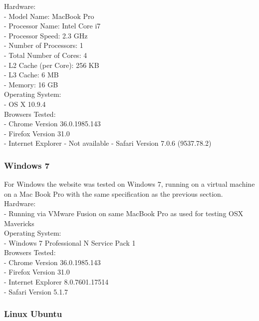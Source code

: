 \documentclass[a4paper,11pt,twoside]{article}
\begin{document}
\noindent Hardware:\\
- Model Name:	MacBook Pro\\
- Processor Name:	Intel Core i7\\
- Processor Speed:	2.3 GHz\\
- Number of Processors:	1\\
- Total Number of Cores:	4\\
- L2 Cache (per Core):	256 KB\\
- L3 Cache:	6 MB\\
- Memory:	16 GB\\


\noindent Operating System:\\
- OS X 10.9.4\\

\noindent Browsers Tested:\\
- Chrome Version 36.0.1985.143\\
- Firefox Version 31.0\\
- Internet Explorer - Not available
- Safari Version 7.0.6 (9537.78.2)\\

\subsubsection*{Windows 7}

For Windows the website was tested on Windows 7, running on a virtual machine on a Mac Book Pro with the same specification as the previous section.\\

\noindent Hardware:\\
- Running via VMware Fusion on same MacBook Pro as used for testing OSX Mavericks\\

\noindent Operating System:\\
- Windows 7 Professional N Service Pack 1\\

\noindent Browsers Tested:\\
- Chrome Version 36.0.1985.143\\
- Firefox Version 31.0\\
- Internet Explorer 8.0.7601.17514\\
- Safari Version 5.1.7\\


\subsubsection*{Linux Ubuntu}
\end{document}
